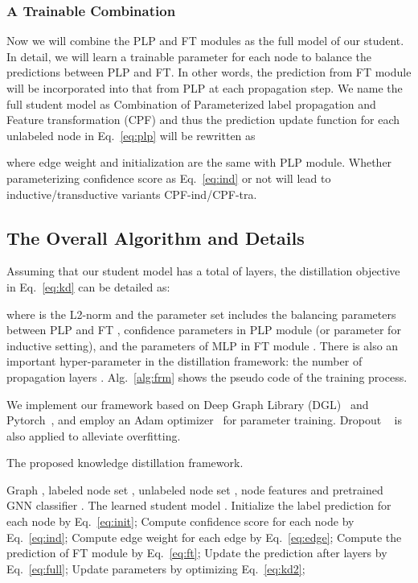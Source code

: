 \documentclass[sigconf]{acmart}
\begin{document}
\subsubsection{A Trainable Combination} 
Now we will combine the PLP and FT modules as the full model of our student. In detail, we will learn a trainable parameter  for each node  to balance the predictions between PLP and FT. In other words, the prediction from FT module will be incorporated into that from PLP at each propagation step. We name the full student model as Combination of Parameterized label propagation and Feature transformation (CPF) and thus the prediction update function for each unlabeled node  in Eq.~\ref{eq:plp} will be rewritten as

where edge weight  and initialization  are the same with PLP module. Whether parameterizing confidence score  as Eq.~\ref{eq:ind} or not will lead to inductive/transductive variants CPF-ind/CPF-tra.

\subsection{The Overall Algorithm and Details}
Assuming that our student model has a total of  layers, the distillation objective in Eq.~\ref{eq:kd} can be detailed as:

where  is the L2-norm and the parameter set  includes the balancing parameters between PLP and FT , confidence parameters in PLP module  (or parameter  for inductive setting), and the parameters of MLP in FT module . There is also an important hyper-parameter in the distillation framework: the number of propagation layers . Alg.~\ref{alg:frm} shows the pseudo code of the training process.

We implement our framework based on Deep Graph Library (DGL)~\cite{wang2019deep} and Pytorch~\cite{paszke2019pytorch}, and employ an Adam optimizer~\cite{kingma2014adam} for parameter training. Dropout ~\cite{srivastava2014dropout} is also applied to alleviate overfitting.



\begin{algorithm}
    \caption{The proposed knowledge distillation framework.}
    \label{alg:frm}
    \begin{algorithmic}[1]
        \REQUIRE Graph , labeled node set , unlabeled node set , node features  and pretrained GNN classifier .
        \ENSURE The learned student model .
        \STATE Initialize the label prediction  for each node  by Eq.~\ref{eq:init};
         \label{alg:while}
        \STATE Compute confidence score  for each node  by Eq.~\ref{eq:ind};
        \ENDIF
        \STATE Compute edge weight  for each edge  by Eq.~\ref{eq:edge};
        \STATE Compute the prediction of FT module  by Eq.~\ref{eq:ft};
        \STATE Update the prediction after  layers  by Eq.~\ref{eq:full};
        \ENDFOR
        \ENDFOR
        \STATE Update parameters by optimizing Eq.~\ref{eq:kd2}; \label{alg:endwhile}
        \ENDWHILE 
    \end{algorithmic}
\end{algorithm}
\end{document}
